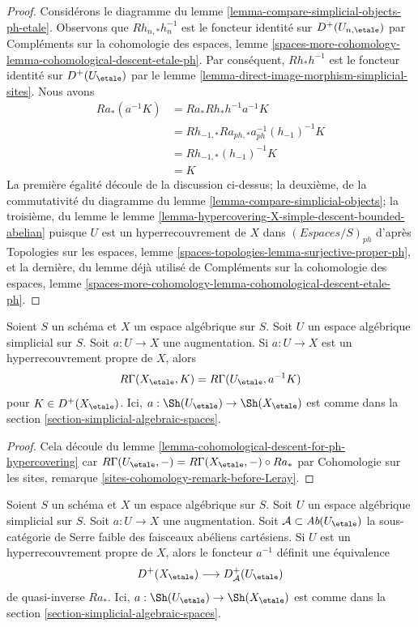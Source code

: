 \begin{proof}
Considérons le diagramme du lemme \ref{lemma-compare-simplicial-objects-ph-etale}.
Observons que $Rh_{n, *}h_n^{-1}$ est le foncteur identité
sur $D^+(U_{n, \etale})$ par
Compléments sur la cohomologie des espaces, lemme
\ref{spaces-more-cohomology-lemma-cohomological-descent-etale-ph}.
Par conséquent, $Rh_*h^{-1}$ est le foncteur identité sur
$D^+(U_\etale)$ par
le lemme \ref{lemma-direct-image-morphism-simplicial-sites}.
Nous avons
\begin{align*}
Ra_*(a^{-1}K)
& =
Ra_*Rh_*h^{-1}a^{-1}K \\
& =
Rh_{-1, *}Ra_{ph, *}a_{ph}^{-1}(h_{-1})^{-1}K \\
& =
Rh_{-1, *}(h_{-1})^{-1}K \\
& =
K
\end{align*}
La première égalité découle de la discussion ci-dessus; la deuxième,
de la commutativité du diagramme du lemme
\ref{lemma-compare-simplicial-objects}; la troisième, du lemme
le lemme \ref{lemma-hypercovering-X-simple-descent-bounded-abelian}
puisque $U$ est un hyperrecouvrement de $X$ dans $(\textit{Espaces}/S)_{ph}$
d'après Topologies sur les espaces, lemme
\ref{spaces-topologies-lemma-surjective-proper-ph},
et la dernière, du lemme déjà utilisé de
Compléments sur la cohomologie des espaces, lemme
\ref{spaces-more-cohomology-lemma-cohomological-descent-etale-ph}.
\end{proof}

\begin{lemma}
\label{lemma-compute-via-ph-hypercovering}
Soient $S$ un schéma et $X$ un espace algébrique sur $S$.
Soit $U$ un espace algébrique simplicial sur $S$. Soit $a : U \to X$
une augmentation. Si $a : U \to X$ est un hyperrecouvrement propre de $X$, alors
$$
R\Gamma(X_\etale, K) = R\Gamma(U_\etale, a^{-1}K)
$$
pour $K \in D^+(X_\etale)$. Ici, $a : \Sh(U_\etale) \to \Sh(X_\etale)$
est comme dans la section \ref{section-simplicial-algebraic-spaces}.
\end{lemma}

\begin{proof}
Cela découle du lemme
\ref{lemma-cohomological-descent-for-ph-hypercovering}
car $R\Gamma(U_\etale, -) = R\Gamma(X_\etale, -) \circ Ra_*$ par
Cohomologie sur les sites, remarque \ref{sites-cohomology-remark-before-Leray}.
\end{proof}

\begin{lemma}
\label{lemma-ph-hypercovering-equivalence-bounded}
Soient $S$ un schéma et $X$ un espace algébrique sur $S$.
Soit $U$ un espace algébrique simplicial sur $S$. Soit $a : U \to X$
une augmentation.
Soit $\mathcal{A} \subset \textit{Ab}(U_\etale)$
la sous-catégorie de Serre faible des faisceaux abéliens cartésiens.
Si $U$ est un hyperrecouvrement propre de $X$, alors
le foncteur $a^{-1}$ définit une équivalence
$$
D^+(X_\etale) \longrightarrow D_\mathcal{A}^+(U_\etale)
$$
de quasi-inverse $Ra_*$. Ici, $a : \Sh(U_\etale) \to \Sh(X_\etale)$
est comme dans la section \ref{section-simplicial-algebraic-spaces}.
\end{lemma}

